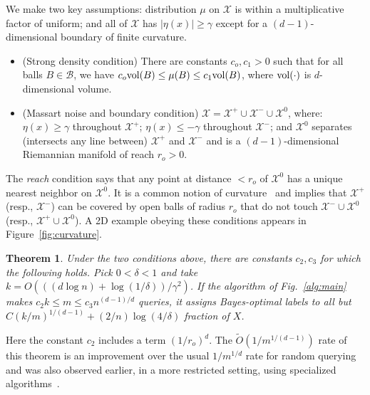 \documentclass[twoside]{article}
\def\X{{\mathcal X}}
\def\B{{\mathcal B}}
\def\vol{{\rm vol}}
\newtheorem{thm}{Theorem}
\begin{document}
We make two key assumptions: distribution $\mu$ on $\X$ is within a multiplicative factor of uniform; and all of $\X$ has $|\eta(x)| \geq \gamma$ except for a $(d-1)$-dimensional boundary of finite curvature.
\begin{itemize}[leftmargin=0.5cm]
\item (Strong density condition)
There are constants $c_o, c_1 > 0$ such that for all balls $B \in \B$,
we have $c_o \vol(B) \leq \mu(B) \leq c_1 \vol(B) $, where $\vol(\cdot)$ is $d$-dimensional volume.
\item (Massart noise and boundary condition) $\X = \X^+ \cup \X^- \cup \X^0$, where: $\eta(x) \geq \gamma$ throughout $\X^+$; $\eta(x) \leq -\gamma$ throughout $\X^-$; and $\X^0$ separates (intersects any line between) $\X^+$ and $\X^-$ and is a $(d-1)$-dimensional Riemannian manifold of reach $r_o > 0$.
\end{itemize}
The \emph{reach} condition says that any point at distance $< r_o$ of $\X^0$ has a unique nearest neighbor on $\X^0$. It is a common notion of curvature~\cite{F59,NSW06} and implies that $\X^+$ (resp., $\X^-$) can be covered by open balls of radius $r_o$ that do not touch $\X^- \cup \X^0$ (resp., $\X^+ \cup \X^0$). A 2D example obeying these conditions appears in Figure~\ref{fig:curvature}.
\begin{thm}
  Under the two conditions above, there are constants $c_2, c_3$ for
  which the following holds. Pick $0 < \delta < 1$ and take
  $k = O(((d \log n) + \log (1/\delta))/\gamma^2)$. If the algorithm
  of Fig.~\ref{alg:main} makes $c_2k \leq m \leq c_3 n^{(d-1)/d}$
  queries, it assigns Bayes-optimal labels to all but
  $C (k/m)^{1/(d-1)} + (2/n) \log (4/\delta)$ fraction of $X$.
\label{thm:massart-dist}
\end{thm}

 Here the constant $c_2$ includes a term $(1/r_o)^d$. The
$\tilde{O}(1/m^{1/(d-1)})$ rate of this theorem is an improvement over
the usual $1/m^{1/d}$ rate for random querying and was also observed
earlier, in a more restricted setting, using specialized
algorithms~\cite{CN08}.
\end{document}
